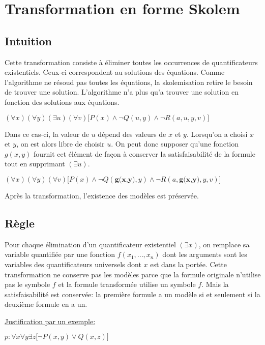 {%

\section{Transformation en forme Skolem}
\subsection{Intuition}

Cette transformation consiste à éliminer toutes les occurrences de quantificateurs existentiels.
Ceux-ci correspondent au solutions des équations.
Comme l'algorithme ne résoud pas toutes les équations, la skolemisation retire le besoin de trouver une solution.
L'algorithme n'a plus qu'a trouver une solution en fonction des solutions aux équations.
\smallskip

$(\forall x)(\forall y)(\exists u)(\forall v) \big[ P(x) \wedge \neg Q(u,y) \wedge \neg R(a,u,y,v) \big]$
\smallskip 


Dans ce cas-ci, la valeur de $u$ dépend des valeurs de $x$ et $y$. Lorsqu'on a choisi $x$ et $y$, on est alors libre de choisir $u$.
On peut donc supposer qu'une fonction $g(x,y)$ fournit cet élément de façon à conserver la satisfaisabilité de la formule tout en supprimant $(\exists u)$.
\smallskip

$(\forall x)(\forall y)(\forall v) \big[ P(x) \wedge \neg Q(\textbf{g(x,y)},y) \wedge \neg R(a,\textbf{g(x,y)},y,v) \big]$
\smallskip

Après la transformation, l'existence des modèles est préservée.

\subsection{Règle}

Pour chaque élimination d'un quantificateur existentiel $(\exists x)$, on remplace sa variable quantifiée par une fonction $f(x_1,...,x_n)$ dont les arguments sont les variables des quantificateurs universels dont $x$ est dans la portée.
Cette transformation ne conserve pas les modèles parce que la formule originale n'utilise pas le symbole $f$
et la formule transformée utilise un symbole $f$.
Mais la satisfaisabilité est conservée: la première formule a un modèle si et seulement si la deuxième formule en a un.
\smallskip

\underline{Justification par un exemple:}

$p: \forall x \forall y \exists z \big[ \neg P(x,y) \vee Q(x,z) \big]$
\smallskip

}
